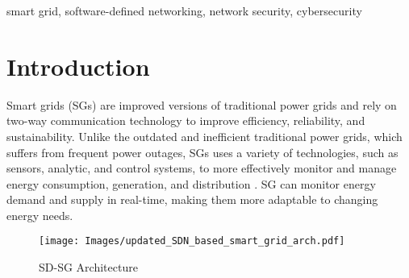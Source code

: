 \documentclass[conference]{IEEEtran}
\begin{document}
\begin{abstract}

\end{abstract}
\begin{IEEEkeywords}
smart grid, software-defined networking, network security, cybersecurity
\end{IEEEkeywords}


\section{Introduction}
\label{sec_intro}

Smart grids (SGs) are improved versions of traditional power grids and rely on two-way communication technology to improve efficiency, reliability, and sustainability. Unlike the outdated and inefficient traditional power grids, which suffers from frequent power outages, SGs uses a variety of technologies, such as sensors, analytic, and control systems, to more effectively monitor and manage energy consumption, generation, and distribution \cite{rehmani2019software}. SG can monitor energy demand and supply in real-time, making them more adaptable to changing energy needs.
\begin{figure*}[ht]
\centering
\texttt{[image: Images/updated\_SDN\_based\_smart\_grid\_arch.pdf]}
\caption{SD-SG Architecture}
\label{fig:SDN_based_smart_grid_arch}
\end{figure*}
\end{document}
